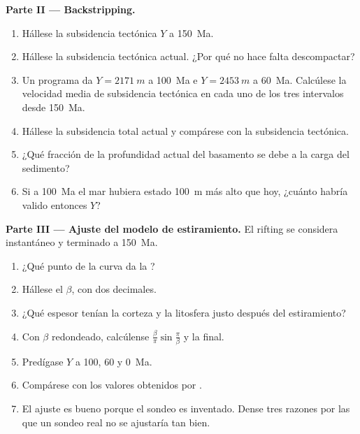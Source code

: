 \begin{problem}
\noindent\textbf{Parte II --- Backstripping.}
\begin{enumerate}[resume]
  \item Hállese la subsidencia tectónica $Y$ a \qty{150}{Ma}.
  \item Hállese la subsidencia tectónica actual. ¿Por qué no hace falta descompactar?
  \item Un programa da $Y = \qty{2171}{m}$ a \qty{100}{Ma} e $Y = \qty{2453}{m}$ a
        \qty{60}{Ma}. Calcúlese la velocidad media de subsidencia tectónica en cada uno de los tres
        intervalos desde \qty{150}{Ma}.
  \item Hállese la subsidencia total actual y compárese con la subsidencia tectónica.
  \item ¿Qué fracción de la profundidad actual del basamento se debe a la carga del sedimento?
  \item Si a \qty{100}{Ma} el mar hubiera estado \qty{100}{m} más alto que hoy, ¿cuánto habría valido
        entonces $Y$?
\end{enumerate}

\noindent\textbf{Parte III --- Ajuste del modelo de estiramiento.} El rifting se considera instantáneo
y terminado a \qty{150}{Ma}.
\begin{enumerate}[resume]
  \item ¿Qué punto de la curva da la ?
  \item Hállese el  $\beta$, con dos decimales.
  \item ¿Qué espesor tenían la corteza y la litosfera justo después del estiramiento?
  \item Con $\beta$ redondeado, calcúlense $\frac{\beta}{\pi}\sin\frac{\pi}{\beta}$ y la  final.
  \item Predígase $Y$ a 100, 60 y \qty{0}{Ma}.
  \item Compárese con los valores obtenidos por .
  \item El ajuste es bueno porque el sondeo es inventado. Dense tres razones por las que un sondeo real
        no se ajustaría tan bien.
\end{enumerate}


\end{problem}
